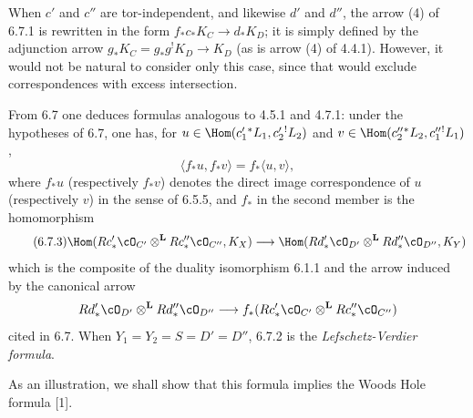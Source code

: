 When $c'$ and $c''$ are tor-independent, and likewise $d'$ and $d''$, the arrow (4) of 6.7.1 is rewritten in the form $f_*c_*K_C\to d_*K_D$; it is simply defined by the adjunction arrow $g_*K_C=g_*g^!K_D\to K_D$ (as is arrow (4) of 4.4.1). However, it would not be natural to consider only this case, since that would exclude correspondences with excess intersection.

From 6.7 one deduces formulas analogous to 4.5.1 and 4.7.1: under the hypotheses of 6.7, one has, for $u\in\Hom(c_1'{}^*L_1,c_2'{}^!L_2)$ and $v\in\Hom(c_2''{}^*L_2,c_1''{}^!L_1)$,
\begin{equation}
\tag{6.7.2}
\langle f_*u,f_*v\rangle=f_*\langle u,v\rangle,
\end{equation}
where $f_*u$ (respectively $f_*v$) denotes the direct image correspondence of $u$ (respectively $v$) in the sense of 6.5.5, and $f_*$ in the second member is the homomorphism
\begin{equation}
\tag{6.7.3}
\Hom(Rc'_*\cO_{C'}\otimes^{\mathbf L}Rc''_*\cO_{C''},K_X)
\longrightarrow
\Hom(Rd'_*\cO_{D'}\otimes^{\mathbf L}Rd''_*\cO_{D''},K_Y)
\end{equation}
which is the composite of the duality isomorphism 6.1.1 and the arrow induced by the canonical arrow
\[
Rd'_*\cO_{D'}\otimes^{\mathbf L}Rd''_*\cO_{D''}\longrightarrow f_*(Rc'_*\cO_{C'}\otimes^{\mathbf L}Rc''_*\cO_{C''})
\]
cited in 6.7. When $Y_1=Y_2=S=D'=D''$, 6.7.2 is the \emph{Lefschetz-Verdier formula}.

As an illustration, we shall show that this formula implies the Woods Hole formula [1].

